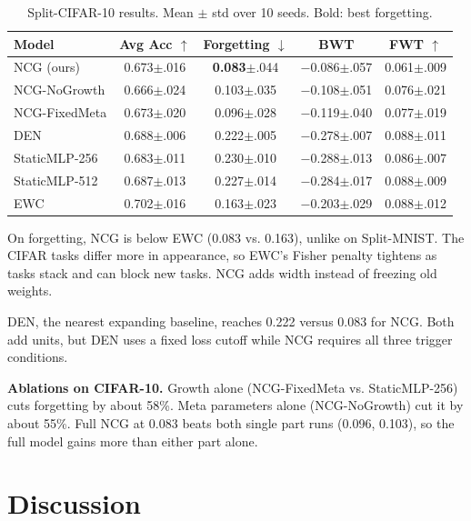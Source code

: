 \documentclass[conference]{IEEEtran}
\begin{document}
\begin{table}[t]
\centering
\caption{Split-CIFAR-10 results. Mean $\pm$ std over 10 seeds. Bold: best forgetting.}
\label{tab:cifar}
\begin{tabular}{lcccc}
\toprule
Model & Avg Acc $\uparrow$ & Forgetting $\downarrow$ & BWT & FWT $\uparrow$ \\
\midrule
NCG (ours) & 0.673{\tiny$\pm$.016} & \textbf{0.083}{\tiny$\pm$.044} & $-$0.086{\tiny$\pm$.057} & 0.061{\tiny$\pm$.009} \\
NCG-NoGrowth & 0.666{\tiny$\pm$.024} & 0.103{\tiny$\pm$.035} & $-$0.108{\tiny$\pm$.051} & 0.076{\tiny$\pm$.021} \\
NCG-FixedMeta & 0.673{\tiny$\pm$.020} & 0.096{\tiny$\pm$.028} & $-$0.119{\tiny$\pm$.040} & 0.077{\tiny$\pm$.019} \\
DEN & 0.688{\tiny$\pm$.006} & 0.222{\tiny$\pm$.005} & $-$0.278{\tiny$\pm$.007} & 0.088{\tiny$\pm$.011} \\
StaticMLP-256 & 0.683{\tiny$\pm$.011} & 0.230{\tiny$\pm$.010} & $-$0.288{\tiny$\pm$.013} & 0.086{\tiny$\pm$.007} \\
StaticMLP-512 & 0.687{\tiny$\pm$.013} & 0.227{\tiny$\pm$.014} & $-$0.284{\tiny$\pm$.017} & 0.088{\tiny$\pm$.009} \\
EWC & 0.702{\tiny$\pm$.016} & 0.163{\tiny$\pm$.023} & $-$0.203{\tiny$\pm$.029} & 0.088{\tiny$\pm$.012} \\
\bottomrule
\end{tabular}
\end{table}

On forgetting, NCG is below EWC (0.083 vs. 0.163), unlike on Split-MNIST. The CIFAR tasks differ more in appearance, so EWC's Fisher penalty tightens as tasks stack and can block new tasks. NCG adds width instead of freezing old weights.

DEN, the nearest expanding baseline, reaches 0.222 versus 0.083 for NCG. Both add units, but DEN uses a fixed loss cutoff while NCG requires all three trigger conditions.

\textbf{Ablations on CIFAR-10.} Growth alone (NCG-FixedMeta vs. StaticMLP-256) cuts forgetting by about 58\%. Meta parameters alone (NCG-NoGrowth) cut it by about 55\%. Full NCG at 0.083 beats both single part runs (0.096, 0.103), so the full model gains more than either part alone.

\section{Discussion}
\end{document}
